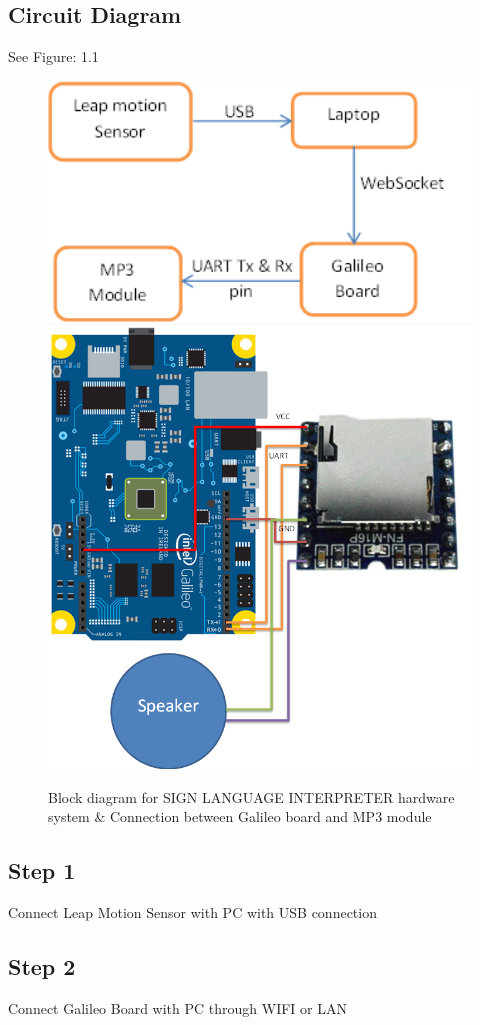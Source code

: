 \documentclass[a4paper,12pt,oneside]{book}
\begin{document}
\subsection*{Circuit Diagram}
See Figure: 1.1
\begin{figure}
  \includegraphics[width=12cm]{1.png}
  \includegraphics[width=12cm]{5.png}
 \caption{Block diagram for SIGN LANGUAGE INTERPRETER hardware system \& Connection between Galileo board and MP3 module}
\end{figure}
\subsection*{Step 1}
Connect Leap Motion Sensor with PC with USB connection
\subsection*{Step 2}
Connect Galileo Board with PC through WIFI or LAN
\end{document}
